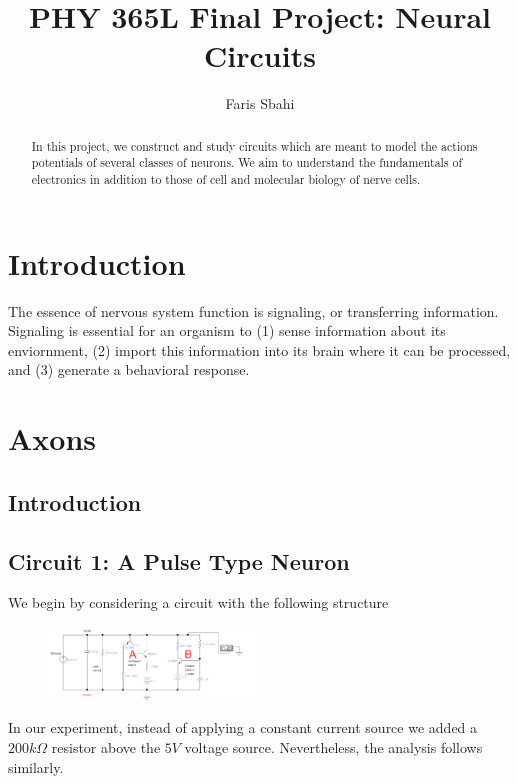 \documentclass[12]{amsbook}
\title{PHY 365L Final Project: Neural Circuits}
\author{Faris Sbahi}
\newcommand\0{\mathbf{0}}
\newcommand\<{\langle}
\renewcommand\>{\rangle}
\begin{document}
\maketitle

\begin{abstract}
In this project, we construct and study circuits which are meant to model the actions potentials of several classes of neurons. We aim to understand the fundamentals of electronics in addition to those of cell and molecular biology of nerve cells.
\end{abstract}

\chapter*{Introduction}

The essence of nervous system function is signaling, or transferring information. Signaling is essential for an organism to (1) sense information about its enviornment, (2) import this information into its brain where it can be processed, and (3) generate a behavioral response.

\chapter{Axons}

\section{Introduction}


\section{Circuit 1: A Pulse Type Neuron}
 
 We begin by considering a circuit with the following structure
 
\begin{figure}[H]
\includegraphics[width=0.5\textwidth]{exercise1-0}
\end{figure}

In our experiment, instead of applying a constant current source we added a $200k\Omega$ resistor above the $5V$ voltage source. Nevertheless, the analysis follows similarly.
\end{document}

